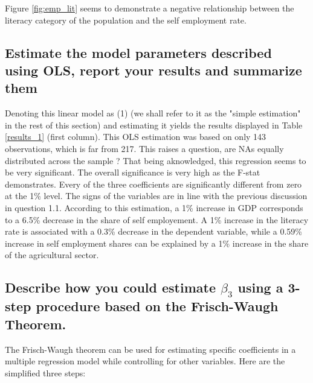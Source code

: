 Figure \ref{fig:emp_lit} seems to demonstrate a negative relationship between the literacy category of the population and the self employment rate.

\subsection{Estimate the model parameters described using OLS, report your results and summarize them}

Denoting this linear model as (1) (we shall refer to it as the "simple estimation" in the rest of this section) and estimating it yields the results displayed in Table \ref{results_1} (first column).
This OLS estimation was based on only 143 observations, which is far from 217. This raises a
question, are NAs equally distributed across the sample ? That being aknowledged, this regression seems
to be very significant. The overall significance is very high as the F-stat demonstrates.
Every of the three coefficients are significantly different from zero at the 1\% level.
The signs of the variables are in line with the previous discussion in question 1.1.
According to this estimation, a 1\% increase in GDP corresponds to a 6.5\% decrease in the share of self employement.
A 1\% increase in the literacy rate is associated with a 0.3\% decrease in the dependent variable, while a 0.59\% increase in self employment shares 
can be explained by a 1\% increase in the share of the agricultural sector.

\subsection{Describe how you could estimate $\beta_3$ using a 3-step procedure based on the Frisch-Waugh Theorem.}
The Frisch-Waugh theorem can be used for estimating specific coefficients in a multiple regression model while controlling for other variables. Here are the simplified three steps:


